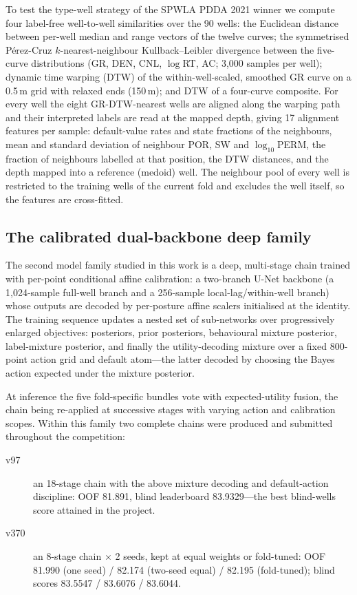\documentclass[preprint,12pt]{elsarticle}
\begin{document}
To test the type-well strategy of the SPWLA PDDA 2021 winner \cite{fu2024contest} we compute four label-free well-to-well similarities over the 90 wells: the Euclidean distance between per-well median and range vectors of the twelve curves; the symmetrised P\'erez-Cruz $k$-nearest-neighbour Kullback--Leibler divergence between the five-curve distributions (GR, DEN, CNL, $\log$RT, AC; 3,000 samples per well); dynamic time warping (DTW) of the within-well-scaled, smoothed GR curve on a 0.5\,m grid with relaxed ends (150\,m); and DTW of a four-curve composite. For every well the eight GR-DTW-nearest wells are aligned along the warping path and their interpreted labels are read at the mapped depth, giving 17 alignment features per sample: default-value rates and state fractions of the neighbours, mean and standard deviation of neighbour POR, SW and $\log_{10}$PERM, the fraction of neighbours labelled at that position, the DTW distances, and the depth mapped into a reference (medoid) well. The neighbour pool of every well is restricted to the training wells of the current fold and excludes the well itself, so the features are cross-fitted.

\subsection{The calibrated dual-backbone deep family}
\label{sec:dl-family}

The second model family studied in this work is a deep, multi-stage chain trained with per-point conditional affine calibration: a two-branch U-Net backbone (a 1,024-sample full-well branch and a 256-sample local-lag/within-well branch) whose outputs are decoded by per-posture affine scalers initialised at the identity. The training sequence updates a nested set of sub-networks over progressively enlarged objectives: posteriors, prior posteriors, behavioural mixture posterior, label-mixture posterior, and finally the utility-decoding mixture over a fixed 800-point action grid and default atom---the latter decoded by choosing the Bayes action expected under the mixture posterior.

At inference the five fold-specific bundles vote with expected-utility fusion, the chain being re-applied at successive stages with varying action and calibration scopes. Within this family two complete chains were produced and submitted throughout the competition:

\begin{description}
\item[v97] an 18-stage chain with the above mixture decoding and default-action discipline: OOF 81.891, blind leaderboard 83.9329---the best blind-wells score attained in the project.
\item[v370] an 8-stage chain $\times$ 2 seeds, kept at equal weights or fold-tuned: OOF 81.990 (one seed) / 82.174 (two-seed equal) / 82.195 (fold-tuned); blind scores 83.5547 / 83.6076 / 83.6044.
\end{description}
\end{document}
